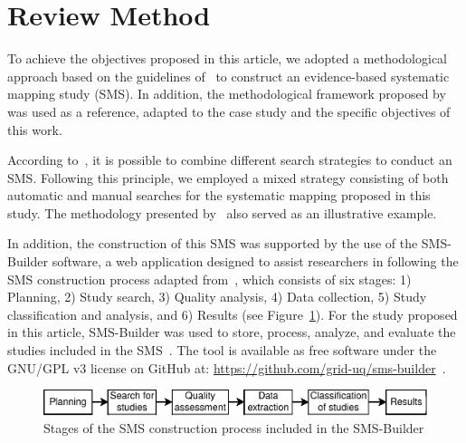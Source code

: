 \section{Review Method}\label{sec:metodo-revision}

To achieve the objectives proposed in this article, we adopted a methodological approach based on the guidelines of~\cite{Kitchenham2010792, budgen2008using} to construct an evidence-based systematic mapping study (SMS). In addition, the methodological framework proposed by~\cite{Sepúlveda202141} was used as a reference, adapted to the case study and the specific objectives of this work.

According to~\cite{Erica2017HybridSS, Nguyen201562}, it is possible to combine different search strategies to conduct an SMS. Following this principle, we employed a mixed strategy consisting of both automatic and manual searches for the systematic mapping proposed in this study. The methodology presented by~\cite{Ali201988196} also served as an illustrative example.

In addition, the construction of this SMS was supported by the use of the SMS-Builder software, a web application designed to assist researchers in following the SMS construction process adapted from~\cite{Kitchenham2010792}, which consists of six stages: 1) Planning, 2) Study search, 3) Quality analysis, 4) Data collection, 5) Study classification and analysis, and 6) Results (see Figure~\ref{figure:Stages}). For the study proposed in this article, SMS-Builder was used to store, process, analyze, and evaluate the studies included in the SMS~\cite{Candela2022100935}. The tool is available as free software under the GNU/GPL v3 license on GitHub at: \url{https://github.com/grid-uq/sms-builder}~\cite{Candela2022100935}.

\begin{figure}[ht]
	\centering
	\includegraphics[scale=1.1]{resources/figures/sms-Etapas.eps}
	\caption{Stages of the SMS construction process included in the SMS-Builder}
	\label{figure:Stages}
\end{figure}













